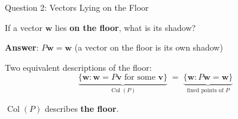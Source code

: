 \documentclass[10pt]{beamer}
\theoremstyle{definition}
\newcommand{\x}[1]{\alert{\textbf{#1}}}
\begin{document}
\begin{frame}{Question 2: Vectors Lying on the Floor}

If a vector $\mathbf{w}$ lies \x{on the floor}, what is its shadow?

\begin{center}
\end{center}

\vspace{0.5em}

\x{Answer}: $P\mathbf{w} = \mathbf{w}$ (a vector on the floor is its own shadow)

\vspace{0.5em}

Two equivalent descriptions of the floor:
$$\underbrace{\{\mathbf{w} : \mathbf{w} = P\mathbf{v} \text{ for some } \mathbf{v}\}}_{\operatorname{Col}(P)} \;=\; \underbrace{\{\mathbf{w} : P\mathbf{w} = \mathbf{w}\}}_{\text{fixed points of } P}$$

\vspace{0.5em}

$\operatorname{Col}(P)$ describes \x{the floor}.

\end{frame}
\end{document}
